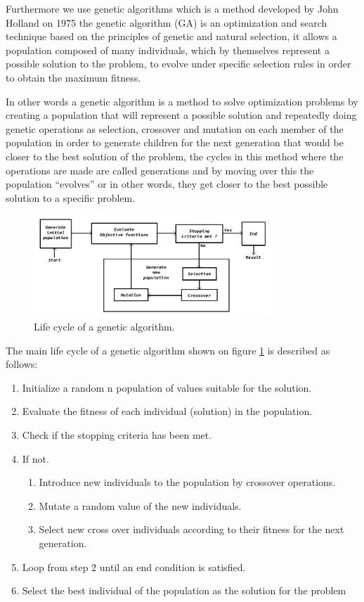 \documentclass[conference]{IEEEtran}
\begin{document}
Furthermore we use genetic algorithms which is a method developed by 
John Holland on 1975 \cite{Holland1975} the genetic
algorithm (GA) is an optimization and search technique based on the principles
of genetic and natural selection, it allows a population composed of many
individuals, which by themselves represent a possible solution to the problem,
to evolve under specific selection rules in order to obtain the maximum fitness.

In other words a genetic algorithm is a method to solve optimization problems by
creating a population that will represent a possible solution and repeatedly
doing genetic operations as selection, crossover and mutation on each member of
the population in order to generate children for the next
generation that would be closer to the best solution of the problem, 
the cycles in this method where the operations are made are called
generations and by moving over this the population “evolves” or in other words,
they get closer to the best possible solution  to a specific problem.

\begin{figure}[htbp]
    \centerline{\includegraphics[width=90mm]{Images/ga_life_cycle.png}}
    \caption{Life cycle of a genetic algorithm.}
    \label{algorithm_model}
\end{figure}
    
    
The main life cycle of a genetic algorithm shown on figure \ref{algorithm_model}
is described as follows:
\begin{enumerate}
    \item Initialize a random n population of values suitable for the solution.
    \item Evaluate the fitness of each individual (solution) in the population.
    \item Check if the stopping criteria has been met.
    \item If not.
    \begin{enumerate}
        \item Introduce new individuals to the population by crossover
        operations.
        \item Mutate a random value of the new individuals.
        \item Select new cross over individuals according to their fitness for
        the next generation.
    \end{enumerate}
    \item Loop from step 2 until an end condition is satisfied.
    \item Select the best individual of the population as the solution for the
    problem
\end{enumerate}
\end{document}
